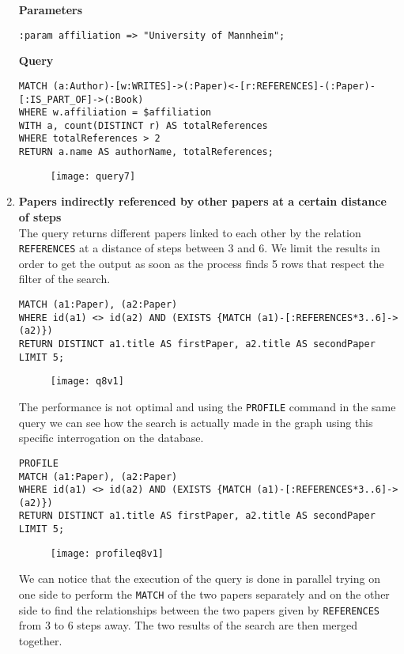 \begin{enumerate}
    \textbf{Parameters}
    \begin{lstlisting}[label={lst:lstlisting32}]
:param affiliation => "University of Mannheim";
    \end{lstlisting}
    \textbf{Query}
    \begin{lstlisting}[label={lst:lstlisting33}]
MATCH (a:Author)-[w:WRITES]->(:Paper)<-[r:REFERENCES]-(:Paper)-[:IS_PART_OF]->(:Book)
WHERE w.affiliation = $affiliation
WITH a, count(DISTINCT r) AS totalReferences
WHERE totalReferences > 2
RETURN a.name AS authorName, totalReferences;
    \end{lstlisting}
    \begin{figure}[H]
        \begin{center}
            \texttt{[image: query7]}
            \label{fig:query7}%
        \end{center}
    \end{figure}
    \item \textbf{Papers indirectly referenced by other papers at a certain distance of steps}\\
    The query returns different papers linked to each other by the relation \verb|REFERENCES| at a distance of steps between 3 and 6.
    We limit the results in order to get the output as soon as the process finds 5 rows that respect the filter of the search.
    \begin{lstlisting}[label={lst:lstlisting34}]
MATCH (a1:Paper), (a2:Paper)
WHERE id(a1) <> id(a2) AND (EXISTS {MATCH (a1)-[:REFERENCES*3..6]->(a2)})
RETURN DISTINCT a1.title AS firstPaper, a2.title AS secondPaper
LIMIT 5;
    \end{lstlisting}
    \begin{figure}[H]
        \begin{center}
            \texttt{[image: q8v1]}
            \label{fig:q8v1}%
        \end{center}
    \end{figure}
    The performance is not optimal and using the \verb|PROFILE| command in the same query we can see how the search is actually made in the graph using this specific interrogation on the database.
    \begin{lstlisting}[label={lst:lstlisting35}]
PROFILE
MATCH (a1:Paper), (a2:Paper)
WHERE id(a1) <> id(a2) AND (EXISTS {MATCH (a1)-[:REFERENCES*3..6]->(a2)})
RETURN DISTINCT a1.title AS firstPaper, a2.title AS secondPaper LIMIT 5;
    \end{lstlisting}
    \begin{figure}[H]
        \begin{center}
            \texttt{[image: profileq8v1]}
            \label{fig:profileq8v1}%
        \end{center}
    \end{figure}
    We can notice that the execution of the query is done in parallel trying on one side to perform the \verb|MATCH| of the two papers separately and on the other side to find the relationships between the two papers given by \verb|REFERENCES| from 3 to 6 steps away.
    The two results of the search are then merged together.


\end{enumerate}
